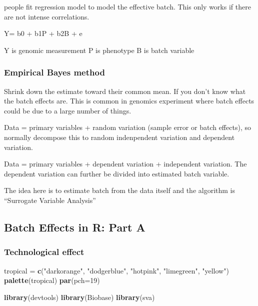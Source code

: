 \documentclass[]{article}
\newenvironment{Shaded}{\begin{snugshade}}{\end{snugshade}}
\newcommand{\KeywordTok}[1]{\textcolor[rgb]{0.13,0.29,0.53}{\textbf{#1}}}
\newcommand{\DataTypeTok}[1]{\textcolor[rgb]{0.13,0.29,0.53}{#1}}
\newcommand{\DecValTok}[1]{\textcolor[rgb]{0.00,0.00,0.81}{#1}}
\newcommand{\StringTok}[1]{\textcolor[rgb]{0.31,0.60,0.02}{#1}}
\newcommand{\NormalTok}[1]{#1}
\begin{document}
people fit regression model to model the effective batch. This only
works if there are not intense correlations.

Y= b0 + b1P + b2B + e

Y is genomic measurement P is phenotype B is batch variable

\subsubsection{Empirical Bayes method}\label{empirical-bayes-method}

Shrink down the estimate toward their common mean. If you don't know
what the batch effects are. This is common in genomics experiment where
batch effects could be due to a large number of things.

Data = primary variables + random variation (sample error or batch
effects), so normally decompose this to random indenpendent variation
and dependent variation.

Data = primary variables + dependent variation + independent variation.
The dependent variation can further be divided into estimated batch
variable.

The idea here is to estimate batch from the data itself and the
algorithm is ``Surrogate Variable Analysis''

\subsection{Batch Effects in R: Part A}\label{batch-effects-in-r-part-a}

\subsubsection{Technological effect}\label{technological-effect}

\begin{Shaded}
\begin{Highlighting}[]
\NormalTok{tropical =}\StringTok{ }\KeywordTok{c}\NormalTok{(}\StringTok{"darkorange"}\NormalTok{, }\StringTok{"dodgerblue"}\NormalTok{, }\StringTok{"hotpink"}\NormalTok{, }\StringTok{"limegreen"}\NormalTok{, }\StringTok{"yellow"}\NormalTok{)}
\KeywordTok{palette}\NormalTok{(tropical)}
\KeywordTok{par}\NormalTok{(}\DataTypeTok{pch=}\DecValTok{19}\NormalTok{)}

\KeywordTok{library}\NormalTok{(devtools)}
\KeywordTok{library}\NormalTok{(Biobase)}
\KeywordTok{library}\NormalTok{(sva)}
\end{Highlighting}
\end{Shaded}
\end{document}
